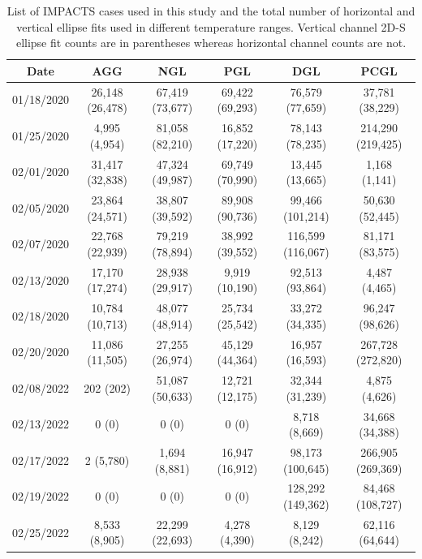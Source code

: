 \documentclass[amt, manuscript]{copernicus}
\begin{document}
\FloatBarrier
\begin{table}
    \centering
        \caption{List of IMPACTS cases used in this study and the total number of horizontal and vertical ellipse fits used in different temperature ranges. Vertical channel 2D-S ellipse fit counts are in parentheses whereas horizontal channel counts are not. }
    
   \begin{tabular}{c c c c c c}
    \toprule 
    \toprule
          Date    &  AGG&  NGL  & PGL & DGL & PCGL\tabularnewline
          \midrule
        01/18/2020  & 26,148 (26,478)  & 67,419 (73,677)  & 69,422 (69,293) & 76,579 (77,659) &  37,781 (38,229) \tabularnewline
        01/25/2020  & 4,995 (4,954)  & 81,058 (82,210) & 16,852 (17,220)  & 78,143 (78,235)& 214,290 (219,425) \tabularnewline
        02/01/2020  & 31,417 (32,838)  & 47,324 (49,987) & 69,749 (70,990) & 13,445 (13,665) & 1,168 (1,141) \tabularnewline
        02/05/2020  & 23,864 (24,571)  & 38,807 (39,592) & 89,908 (90,736)  & 99,466 (101,214) & 50,630 (52,445) \tabularnewline
        02/07/2020 & 22,768 (22,939) & 79,219 (78,894) & 38,992 (39,552) & 116,599 (116,067)&  81,171 (83,575) \tabularnewline
        02/13/2020 & 17,170 (17,274) & 28,938 (29,917) & 9,919 (10,190) & 92,513 (93,864) & 4,487 (4,465)  \tabularnewline
        02/18/2020 & 10,784 (10,713)  & 48,077 (48,914) & 25,734 (25,542) & 33,272 (34,335) & 96,247 (98,626) \tabularnewline
        02/20/2020 & 11,086 (11,505)  & 27,255 (26,974) & 45,129 (44,364) & 16,957 (16,593) & 267,728 (272,820)  \tabularnewline
        02/08/2022 & 202 (202)  & 51,087 (50,633) & 12,721 (12,175) & 32,344 (31,239) &  4,875 (4,626) \tabularnewline
        02/13/2022 & 0 (0)  & 0 (0) & 0 (0) & 8,718 (8,669) & 34,668 (34,388) \tabularnewline
        02/17/2022 & 2 (5,780)  & 1,694 (8,881) & 16,947 (16,912)  & 98,173 (100,645) &  266,905 (269,369) \tabularnewline
        02/19/2022 & 0 (0)  & 0 (0) & 0 (0)  & 128,292 (149,362) & 84,468 (108,727) \tabularnewline
        02/25/2022 & 8,533 (8,905) & 22,299 (22,693) & 4,278 (4,390)  & 8,129 (8,242) &  62,116 (64,644) \tabularnewline

\end{tabular}
\end{table}
\end{document}
